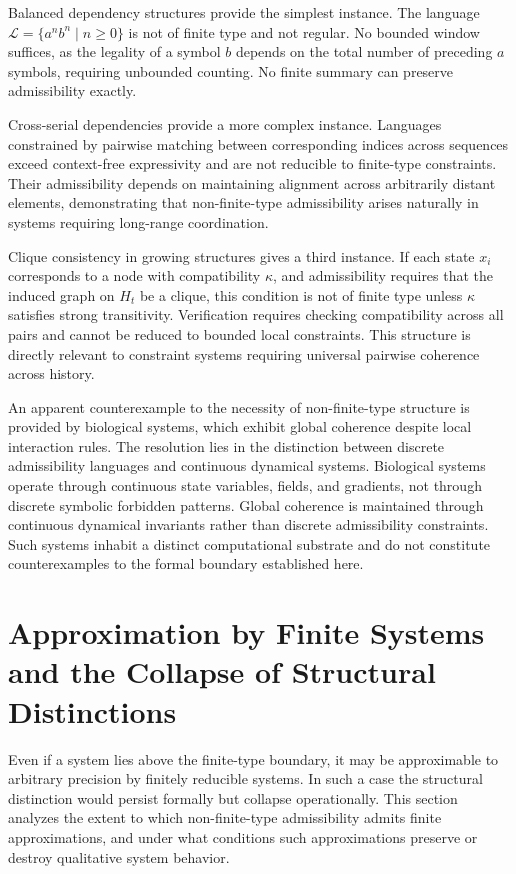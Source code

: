 \documentclass[12pt, a4paper]{article}
\theoremstyle{plain}
\theoremstyle{definition}
\theoremstyle{remark}
\begin{document}
Balanced dependency structures provide the simplest instance. The language $\mathcal{L} = \{a^n b^n \mid n \ge 0\}$ is not of finite type and not regular. No bounded window suffices, as the legality of a symbol $b$ depends on the total number of preceding $a$ symbols, requiring unbounded counting. No finite summary can preserve admissibility exactly.

Cross-serial dependencies provide a more complex instance. Languages constrained by pairwise matching between corresponding indices across sequences exceed context-free expressivity and are not reducible to finite-type constraints. Their admissibility depends on maintaining alignment across arbitrarily distant elements, demonstrating that non-finite-type admissibility arises naturally in systems requiring long-range coordination.

Clique consistency in growing structures gives a third instance. If each state $x_i$ corresponds to a node with compatibility $\kappa$, and admissibility requires that the induced graph on $H_t$ be a clique, this condition is not of finite type unless $\kappa$ satisfies strong transitivity. Verification requires checking compatibility across all pairs and cannot be reduced to bounded local constraints. This structure is directly relevant to constraint systems requiring universal pairwise coherence across history.

An apparent counterexample to the necessity of non-finite-type structure is provided by biological systems, which exhibit global coherence despite local interaction rules. The resolution lies in the distinction between discrete admissibility languages and continuous dynamical systems. Biological systems operate through continuous state variables, fields, and gradients, not through discrete symbolic forbidden patterns. Global coherence is maintained through continuous dynamical invariants rather than discrete admissibility constraints. Such systems inhabit a distinct computational substrate and do not constitute counterexamples to the formal boundary established here.

\section{Approximation by Finite Systems and the Collapse of Structural Distinctions}

Even if a system lies above the finite-type boundary, it may be approximable to arbitrary precision by finitely reducible systems. In such a case the structural distinction would persist formally but collapse operationally. This section analyzes the extent to which non-finite-type admissibility admits finite approximations, and under what conditions such approximations preserve or destroy qualitative system behavior.
\end{document}
